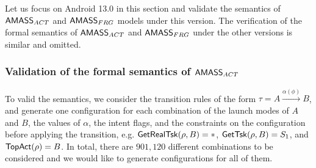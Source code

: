 

Let us focus on Android 13.0 in this section and validate the semantics of $\textsf{AMASS}_{ACT}$ and $\textsf{AMASS}_{FRG}$ models under this version. 
The verification of the formal semantics of $\textsf{AMASS}_{ACT}$ and $\textsf{AMASS}_{FRG}$  under the other versions is similar and omitted. 







\subsubsection{Validation of the formal semantics of $\textsf{AMASS}_{ACT}$}
%
To valid the semantics, we consider the transition rules of the form $\tau = A\xrightarrow{\alpha(\phi)} B$, and generate one configuration for each combination of the launch modes of $A$ and $B$, the values of $\alpha$, the intent flags, and the constraints on the configuration before applying the transition, e.g. $\mathsf{GetRealTsk}(\rho, B) = *$, $\mathsf{GetTsk}(\rho, B) = S_1$, and $\mathsf{TopAct}(\rho) = B$. 
In total, there are $901,120$ different combinations to be considered and we would like to generate configurations for all of them.


